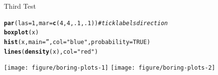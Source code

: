 \documentclass[xcolor=pdftex,dvipsnames,table]{beamer}\usepackage[]{graphicx}\usepackage[]{color}
\makeatletter
\newcommand{\hlnum}[1]{\textcolor[rgb]{0.686,0.059,0.569}{#1}}%
\newcommand{\hlstr}[1]{\textcolor[rgb]{0.192,0.494,0.8}{#1}}%
\newcommand{\hlcom}[1]{\textcolor[rgb]{0.678,0.584,0.686}{\textit{#1}}}%
\newcommand{\hlstd}[1]{\textcolor[rgb]{0.345,0.345,0.345}{#1}}%
\newcommand{\hlkwc}[1]{\textcolor[rgb]{0.333,0.667,0.333}{#1}}%
\newcommand{\hlkwd}[1]{\textcolor[rgb]{0.737,0.353,0.396}{\textbf{#1}}}%
\newenvironment{kframe}{%
 \def\at@end@of@kframe{}%
 \ifinner\ifhmode%
  \def\at@end@of@kframe{\end{minipage}}%
  \begin{minipage}{\columnwidth}%
 \fi\fi%
 \def\FrameCommand##1{\hskip\@totalleftmargin \hskip-\fboxsep
 \colorbox{shadecolor}{##1}\hskip-\fboxsep
     \hskip-\linewidth \hskip-\@totalleftmargin \hskip\columnwidth}%
 \MakeFramed {\advance\hsize-\width
   \@totalleftmargin\z@ \linewidth\hsize
   \@setminipage}}%
 {\par\unskip\endMakeFramed%
 \at@end@of@kframe}
\newenvironment{knitrout}{}{} %
\makeatother
\begin{document}
\begin{frame}[fragile]{Third Test}
\begin{knitrout}
\color{fgcolor}\begin{kframe}
\begin{alltt}
\hlkwd{par}\hlstd{(}\hlkwc{las}\hlstd{=}\hlnum{1}\hlstd{,}\hlkwc{mar}\hlstd{=}\hlkwd{c}\hlstd{(}\hlnum{4}\hlstd{,}\hlnum{4}\hlstd{,}\hlnum{.1}\hlstd{,}\hlnum{.1}\hlstd{))}  \hlcom{# tick labels direction}
\hlkwd{boxplot}\hlstd{(x)}
\hlkwd{hist}\hlstd{(x,}\hlkwc{main}\hlstd{=}\hlstr{''}\hlstd{,}\hlkwc{col}\hlstd{=}\hlstr{"blue"}\hlstd{,}\hlkwc{probability}\hlstd{=}\hlnum{TRUE}\hlstd{)}
\hlkwd{lines}\hlstd{(}\hlkwd{density}\hlstd{(x),}\hlkwc{col}\hlstd{=}\hlstr{"red"}\hlstd{)}
\end{alltt}
\end{kframe}
\texttt{[image: figure/boring-plots-1]} 
\texttt{[image: figure/boring-plots-2]} 

\end{knitrout}
\end{frame}
\end{document}

